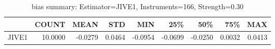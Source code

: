 \begin{table}[ht]
\centering
\caption{bias summary: Estimator=JIVE1, Instruments=166, Strength=0.30}
\begin{tabular}{lrrrrrrrr}
\toprule
 & COUNT & MEAN & STD & MIN & 25\% & 50\% & 75\% & MAX \\
\midrule
JIVE1 & 10.0000 & -0.0279 & 0.0464 & -0.0954 & -0.0699 & -0.0250 & 0.0032 & 0.0413 \\
\bottomrule
\end{tabular}
\end{table}
